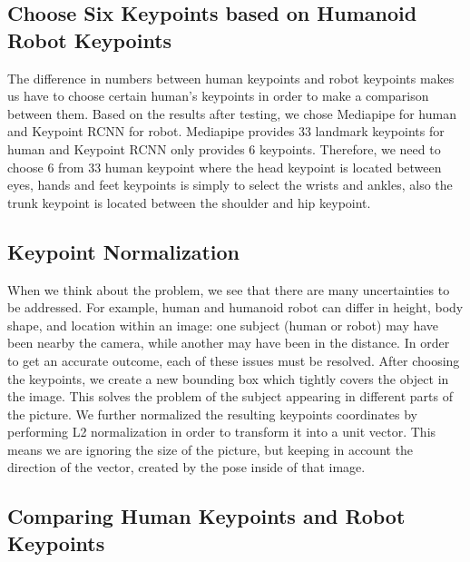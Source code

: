 \subsection{Choose Six Keypoints based on Humanoid Robot Keypoints}
\label{subsec:choose-keypoints}

The difference in numbers between human keypoints and robot keypoints makes us have to choose certain human's keypoints in order to make a comparison between them.
Based on the results after testing, we chose Mediapipe for human and Keypoint RCNN for robot. Mediapipe provides 33 landmark keypoints for human and Keypoint RCNN only provides 6 keypoints.
Therefore, we need to choose 6 from 33 human keypoint where the head keypoint is located between eyes, hands and feet keypoints is simply to select the wrists and ankles, also the trunk keypoint is located between the shoulder and hip keypoint.


\subsection{Keypoint Normalization}
\label{subsec:keypoint-normalization}

When we think about the problem, we see that there are many uncertainties to be addressed. For example, human and humanoid robot can differ in height, body shape, and location within an image: one subject (human or robot) may have been nearby the camera,
while another may have been in the distance. In order to get an accurate outcome, each of these issues must be resolved.
After choosing the keypoints, we create a new bounding box which tightly covers the object in the image.
This solves the problem of the subject appearing in different parts of the picture.
We further normalized the resulting keypoints coordinates by performing L2 normalization in order to transform it into a unit vector.
This means we are ignoring the size of the picture, but keeping in account the direction of the vector, created by the pose inside of that image.


\subsection{Comparing Human Keypoints and Robot Keypoints}
\label{subsec:comparing-keypoints}


